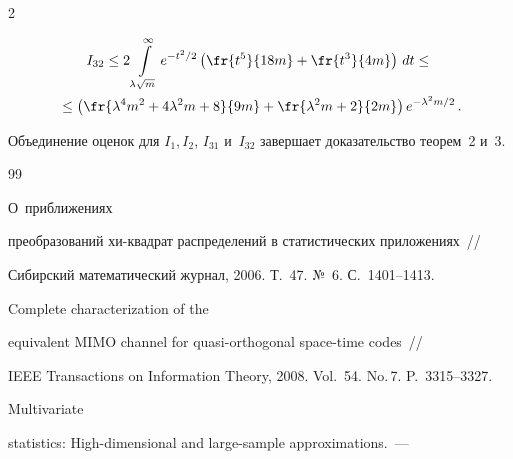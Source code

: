 \begin{multicols}{2}
\noindent


\begin{multline*}


I_{32} \leq  2\int\limits_{\lambda\sqrt{m}}^{\infty} e^{-t^2/2}


\left(\fr{t^5}{18m} + \fr{t^3}{4m}\right)\, dt


 \leq{} \\


{} \leq \left( \fr{\lambda^4m^2 + 4\lambda^2 m +8}{9m} + 


\fr{\lambda^2m + 2}{2m}\right)e^{-\lambda^2m/2} \,.


\end{multline*}


Объединение оценок для   $I_1, I_2$, $I_{31}$ и~$I_{32}$ завершает доказательство теорем~2 и~3.





{\small\frenchspacing


{%




\begin{thebibliography}{99}







  О~приближениях


преобразований хи-квадрат распределений в статистических приложениях~//


Сибирский математический журнал, 2006. Т.~47. №\, 6. С.~1401--1413.









Complete characterization of the


equivalent MIMO channel for quasi-orthogonal space-time codes~//


IEEE Transactions on Information Theory, 2008. Vol.~54. No.\,7. P.~3315--3327.










 Multivariate


statistics: High-dimensional and large-sample approximations.~---



\end{thebibliography}}}
\end{multicols}
